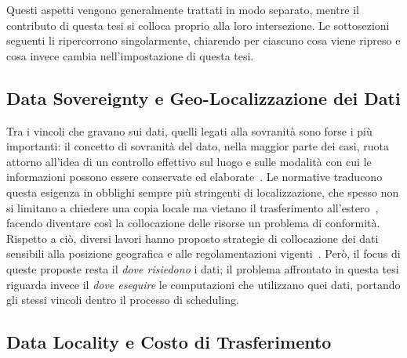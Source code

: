 Questi aspetti vengono generalmente trattati in modo separato, mentre il contributo di questa tesi si colloca proprio alla loro intersezione. Le sottosezioni seguenti li ripercorrono singolarmente, chiarendo per ciascuno cosa viene ripreso e cosa invece cambia nell'impostazione di questa tesi.


\subsection{Data Sovereignty e Geo-Localizzazione dei Dati}
\label{subsec:sovranita_dati_correlati}

Tra i vincoli che gravano sui dati, quelli legati alla sovranità sono forse i più importanti: il concetto di sovranità del dato, nella maggior parte dei casi, ruota attorno all'idea di un controllo effettivo sul luogo e sulle modalità con cui le informazioni possono essere conservate ed elaborate~\cite{data-sovereignty-review}. Le normative traducono questa esigenza in obblighi sempre più stringenti di localizzazione, che spesso non si limitano a chiedere una copia locale ma vietano il trasferimento all'estero~\cite{oecd-data-localisation}, facendo diventare così la collocazione delle risorse un problema di conformità. Rispetto a ciò, diversi lavori hanno proposto strategie di collocazione dei dati sensibili alla posizione geografica e alle regolamentazioni vigenti~\cite{geolocation-aware-data-placement, location-aware-data-placement}. Però, il focus di queste proposte resta il \emph{dove risiedono} i dati; il problema affrontato in questa tesi riguarda invece il \emph{dove eseguire} le computazioni che utilizzano quei dati, portando gli stessi vincoli dentro il processo di scheduling.


\subsection{Data Locality e Costo di Trasferimento}
\label{subsec:data_locality_correlati}


